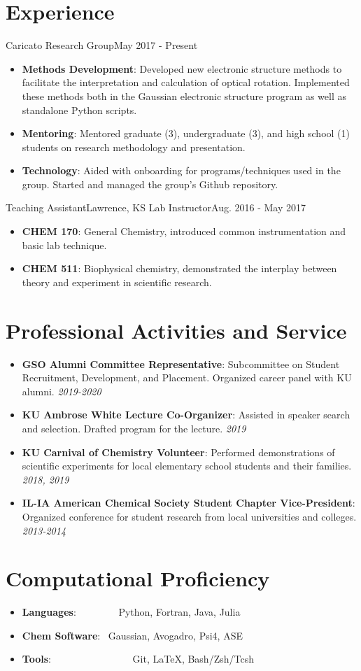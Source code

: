 \documentclass[a4paper,11pt]{article}
\newcommand{\resumeItem}[2]{
  \item\small{
    \textbf{#1}{: #2 \vspace{-2pt}}
  }
}
\newcommand{\resumeSubItem}[2]{\resumeItem{#1}{#2}\vspace{-3pt}}
\newcommand{\resumeSubHeadingListStart}{\begin{itemize}[leftmargin=*]}
\newcommand{\resumeSubHeadingListEnd}{\end{itemize}}
\newcommand{\resumeItemListStart}{\begin{itemize}}
\newcommand{\resumeItemListEnd}{\end{itemize}\vspace{-5pt}}
\begin{document}
\vspace{-5pt}
\section{Experience}
  \resumeSubHeadingListStart
    {Caricato Research Group}{May 2017 - Present}
    \resumeItemListStart
        \resumeItem{Methods Development}
          {Developed new electronic structure methods to facilitate the interpretation and calculation of optical rotation. Implemented these methods both in the Gaussian electronic structure program as well as standalone Python scripts.}
          \resumeItem{Mentoring}
          {Mentored graduate (3), undergraduate (3), and high school (1) students on research methodology and presentation.}
          \resumeItem{Technology}
          {Aided with onboarding for programs/techniques used in the group. Started and managed the group's Github repository.}
      \resumeItemListEnd
    \resumeSubheading
		{Teaching Assistant}{Lawrence, KS}
		{Lab Instructor}{Aug. 2016 - May 2017}
		\resumeItemListStart
        \resumeItem{CHEM 170}
          {General Chemistry, introduced common instrumentation and basic lab technique.}
        \resumeItem{CHEM 511}
          {Biophysical chemistry, demonstrated the interplay between theory and experiment in scientific research.}
		\resumeItemListEnd

\resumeSubHeadingListEnd


\vspace{-5pt}
\section{Professional Activities and Service}
  \resumeSubHeadingListStart
	\resumeSubItem{GSO Alumni Committee Representative}
    {Subcommittee on Student Recruitment, Development, and Placement. Organized career panel with KU alumni. \textit{2019-2020}}
    \resumeSubItem{KU Ambrose White Lecture Co-Organizer}
    {Assisted in speaker search and selection. Drafted program for the lecture. \textit{2019}}
    \resumeSubItem{KU Carnival of Chemistry Volunteer}
    {Performed demonstrations of scientific experiments for local elementary school students and their families. \textit{2018, 2019}}
    \resumeSubItem{IL-IA American Chemical Society Student Chapter Vice-President}{Organized conference for student research from local universities and colleges. \textit{2013-2014}} 

\resumeSubHeadingListEnd

\vspace{-5pt}
\section{Computational Proficiency}
	\resumeSubHeadingListStart
	\resumeSubItem{Languages}{~~~~~~~~Python, Fortran, Java, Julia}
	\resumeSubItem{Chem Software}{~Gaussian, Avogadro, Psi4, ASE}
	\resumeSubItem{Tools}{~~~~~~~~~~~~~~~~Git, LaTeX, Bash/Zsh/Tcsh}
    \resumeSubHeadingListEnd
\end{document}
